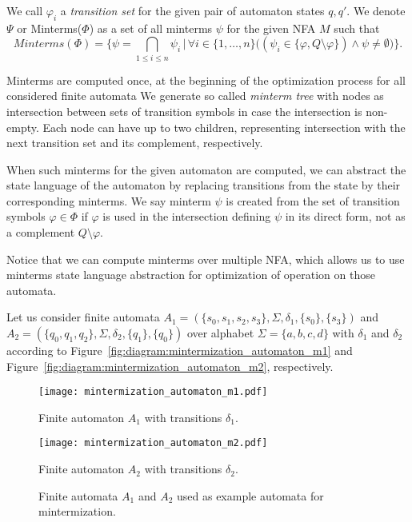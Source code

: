 We call $\varphi_i$ a \emph{transition  set} for the given pair of automaton states $q, q'$. We denote $\Psi$ or Minterms($\Phi$) as a set of all minterms $\psi$ for the given NFA $M$ such that
$$ Minterms(\Phi) = \biggr\{ \psi = \bigcap_{1 \leq i \leq n} \psi_i \,\biggr|\,
\forall i \in \{1, \dots, n\} \bigr( (\psi_i \in \{ \varphi, Q \setminus \varphi \}) \land \psi \neq \emptyset \bigr) \biggr\} \text{.} $$

Minterms are computed once, at the beginning of the optimization process for all considered finite automata
We generate so called \emph{minterm tree} with nodes as intersection between sets of transition symbols in case the intersection is non-empty. Each node can have up to two children, representing intersection with the next transition set and its complement, respectively.

When such minterms for the given automaton are computed, we can abstract the state language of the automaton by replacing transitions from the state by their corresponding minterms. We say minterm $\psi$ is created from the set of transition symbols $\varphi \in \Phi$ if $\varphi$ is used in the intersection defining $\psi$ in its direct form, not as a complement $Q \setminus \varphi$.

Notice that we can compute minterms over multiple NFA, which allows us to use minterms state language abstraction for optimization of operation on those automata.

Let us consider finite automata $A_1 = (\{s_0, s_1, s_2, s_3\}, \Sigma, \delta_1, \{s_0\}, \{s_3\})$ and $A_2 = (\{q_0, q_1, q_2\}, \Sigma, \delta_2, \{q_1\}, \{q_0\})$ over alphabet $\Sigma = \{a, b, c, d\}$ with $\delta_1$ and $\delta_2$ according to Figure~\ref{fig:diagram:mintermization_automaton_m1} and Figure~\ref{fig:diagram:mintermization_automaton_m2}, respectively.

\begin{figure*}[ht]
    \centering
    \begin{minipage}{0.49\linewidth}
        \centering
        \texttt{[image: mintermization\_automaton\_m1.pdf]}
        \caption{Finite automaton $A_1$ with transitions $\delta_1$.}
        \label{fig:diagram:mintermization_automaton_m1}
    \end{minipage}
    \hfill
    \begin{minipage}{0.49\linewidth}
        \centering
        \texttt{[image: mintermization\_automaton\_m2.pdf]}
        \caption{Finite automaton $A_2$ with transitions $\delta_2$.}
        \label{fig:diagram:mintermization_automaton_m2}
    \end{minipage}
    \vspace{0.5cm}
    \caption{Finite automata $A_1$ and $A_2$ used as example automata for mintermization.}
    \label{fig:diagram:mintermization_automata}
\end{figure*}

